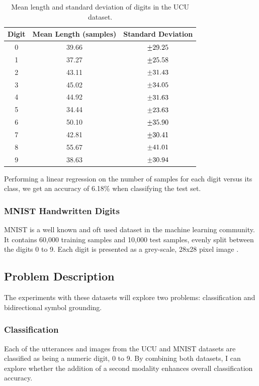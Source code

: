 	\begin{table}
		\centering
		\begin{tabular}{|c|c|c|}
			\hline
			\textbf{Digit} & \textbf{Mean Length (samples)} & \textbf{Standard Deviation} \\ \hline
			0 & 39.66 & $\mypm 29.25$ \\ \hline
			1 & 37.27 & $\mypm 25.58$ \\ \hline
			2 & 43.11 & $\mypm 31.43$ \\ \hline
			3 & 45.02 & $\mypm 34.05$ \\ \hline
			4 & 44.92 & $\mypm 31.63$ \\ \hline
			5 & 34.44 & $\mypm 23.63$ \\ \hline
			6 & 50.10 & $\mypm 35.90$ \\ \hline
			7 & 42.81 & $\mypm 30.41$ \\ \hline
			8 & 55.67 & $\mypm 41.01$ \\ \hline
			9 & 38.63 & $\mypm 30.94$ \\ \hline

		\end{tabular}
		\caption{Mean length and standard deviation of digits in the UCU dataset.}
		\label{tab:UCU_sampLen}
	\end{table}


Performing a linear regression on the number of samples for each digit versus its class, we get an accuracy of 6.18\% when classifying the test set.

\subsubsection{MNIST Handwritten Digits}
MNIST is a well known and oft used dataset in the machine learning community. It contains 60,000 training samples and 10,000 test samples, evenly split between the digits 0 to 9. 
Each digit is presented as a grey-scale, 28x28 pixel image \cite{lecun1998mnist}. 

\subsection{Problem Description}
The experiments with these datasets will explore two problems: classification and bidirectional symbol grounding. 

\subsubsection{Classification}
Each of the utterances and images from the UCU and MNIST datasets are classified as being a numeric digit, 0 to 9. By combining both datasets, I can explore whether the addition of a second modality enhances overall classification accuracy.

